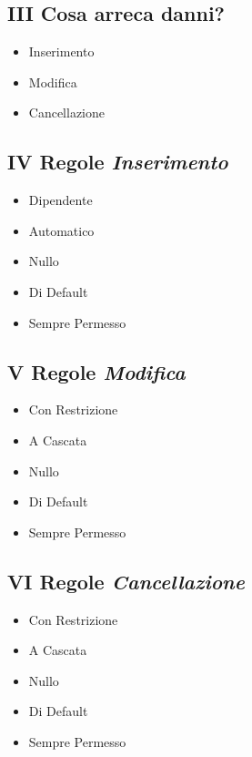 \documentclass[a4paper, 12pt]{report}
\begin{document}
   \subsection{III Cosa arreca danni?}
   \begin{itemize}
       \item Inserimento
       \item Modifica
       \item Cancellazione
   \end{itemize}
   
   \subsection{IV Regole \textit{Inserimento}}
   \begin{itemize}
       \item Dipendente
       \item Automatico
       \item Nullo
       \item Di Default
       \item Sempre Permesso
   \end{itemize}
  
   \subsection{V Regole \textit{Modifica}}
   \begin{itemize}
       \item Con Restrizione
       \item A Cascata
       \item Nullo
       \item Di Default
       \item Sempre Permesso
   \end{itemize}
   
   \subsection{VI Regole \textit{Cancellazione}}
   \begin{itemize}
       \item Con Restrizione
       \item A Cascata
       \item Nullo
       \item Di Default
       \item Sempre Permesso
   \end{itemize}
   
\end{document}
